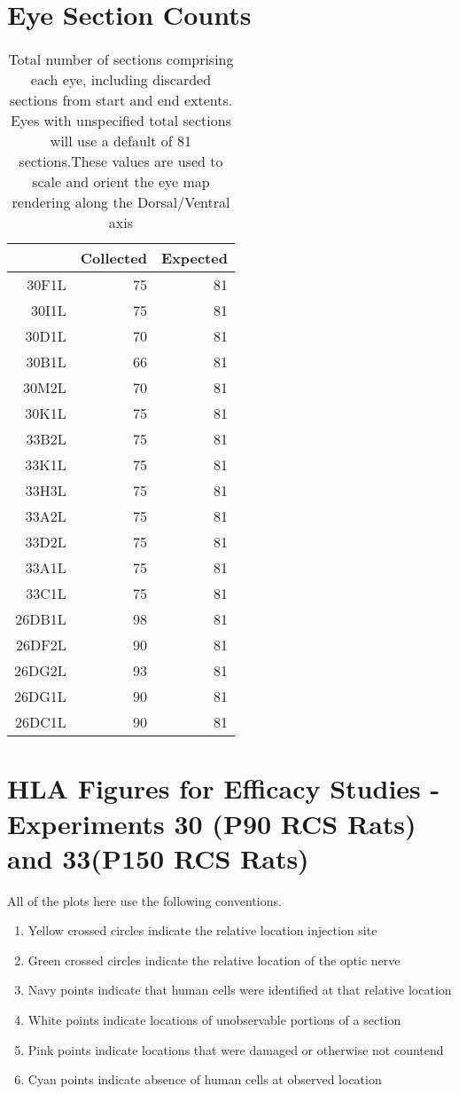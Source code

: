 \documentclass{article}
\begin{document}
\section{Eye Section Counts}
\begin{table}[ht]
\centering
\begin{tabular}{rrr}
  \hline
 & Collected & Expected \\ 
  \hline
30F1L &  75 &  81 \\ 
  30I1L &  75 &  81 \\ 
  30D1L &  70 &  81 \\ 
  30B1L &  66 &  81 \\ 
  30M2L &  70 &  81 \\ 
  30K1L &  75 &  81 \\ 
  33B2L &  75 &  81 \\ 
  33K1L &  75 &  81 \\ 
  33H3L &  75 &  81 \\ 
  33A2L &  75 &  81 \\ 
  33D2L &  75 &  81 \\ 
  33A1L &  75 &  81 \\ 
  33C1L &  75 &  81 \\ 
  26DB1L &  98 &  81 \\ 
  26DF2L  &  90 &  81 \\ 
  26DG2L &  93 &  81 \\ 
  26DG1L &  90 &  81 \\ 
  26DC1L &  90 &  81 \\ 
   \hline
\end{tabular}
\caption{Total number of sections comprising each eye, including discarded sections from start and end extents. Eyes with unspecified total sections will use a default of 81 sections.These values are used to scale and orient the eye map rendering along the Dorsal/Ventral axis} 
\label{sectioncounttable}
\end{table}
\newpage

\section{HLA Figures for Efficacy Studies - Experiments 30 (P90 RCS Rats) and 33(P150 RCS Rats)}
All of the plots here use the following conventions. 
\begin{enumerate}
\item Yellow crossed circles indicate the relative location injection site
\item Green crossed circles indicate the relative location of the optic nerve
\item Navy points indicate that human cells were identified at that relative location
\item White points indicate locations of unobservable portions of a section
\item Pink points indicate locations that were damaged or otherwise not countend
\item Cyan points indicate absence of human cells at observed location
\end{enumerate}
\end{document}
